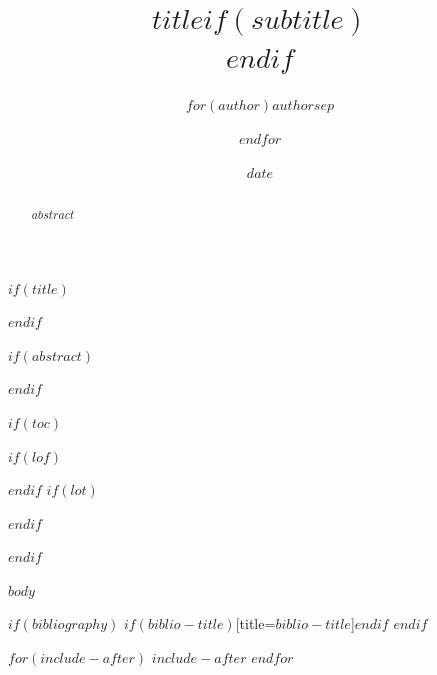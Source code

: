\documentclass[$if(fontsize)$$fontsize$$else$12pt$endif$,$if(papersize)$$papersize$$else$a4paper$endif$,$for(classoption)$$classoption$$sep$,$endfor$]{$documentclass$}
\title{$title$$if(subtitle)$\\\vspace{0.5em}{\large $subtitle$}$endif$}
\author{$for(author)$$author$$sep$ \and $endfor$}
\date{$date$}
\begin{document}
$if(title)$
\maketitle
$endif$

$if(abstract)$
\begin{abstract}
$abstract$
\end{abstract}
$endif$

$if(toc)$
{
\setcounter{tocdepth}{$if(toc-depth)$$toc-depth$$else$3$endif$}
\tableofcontents
$if(lof)$
\listoffigures
$endif$
$if(lot)$
\listoftables
$endif$
\clearpage
}
$endif$

$body$

$if(bibliography)$
\printbibliography$if(biblio-title)$[title=$biblio-title$]$endif$
$endif$

$for(include-after)$
$include-after$
$endfor$
\end{document}
